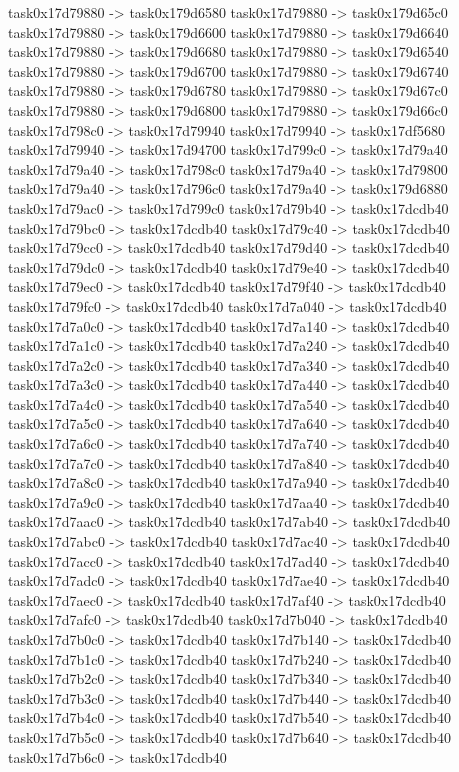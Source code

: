 {	task0x17d79880 -> task0x179d6580
	task0x17d79880 -> task0x179d65c0
	task0x17d79880 -> task0x179d6600
	task0x17d79880 -> task0x179d6640
	task0x17d79880 -> task0x179d6680
	task0x17d79880 -> task0x179d6540
	task0x17d79880 -> task0x179d6700
	task0x17d79880 -> task0x179d6740
	task0x17d79880 -> task0x179d6780
	task0x17d79880 -> task0x179d67c0
	task0x17d79880 -> task0x179d6800
	task0x17d79880 -> task0x179d66c0
	task0x17d798c0 -> task0x17d79940
	task0x17d79940 -> task0x17df5680
	task0x17d79940 -> task0x17d94700
	task0x17d799c0 -> task0x17d79a40
	task0x17d79a40 -> task0x17d798c0
	task0x17d79a40 -> task0x17d79800
	task0x17d79a40 -> task0x17d796c0
	task0x17d79a40 -> task0x179d6880
	task0x17d79ac0 -> task0x17d799c0
	task0x17d79b40 -> task0x17dcdb40
	task0x17d79bc0 -> task0x17dcdb40
	task0x17d79c40 -> task0x17dcdb40
	task0x17d79cc0 -> task0x17dcdb40
	task0x17d79d40 -> task0x17dcdb40
	task0x17d79dc0 -> task0x17dcdb40
	task0x17d79e40 -> task0x17dcdb40
	task0x17d79ec0 -> task0x17dcdb40
	task0x17d79f40 -> task0x17dcdb40
	task0x17d79fc0 -> task0x17dcdb40
	task0x17d7a040 -> task0x17dcdb40
	task0x17d7a0c0 -> task0x17dcdb40
	task0x17d7a140 -> task0x17dcdb40
	task0x17d7a1c0 -> task0x17dcdb40
	task0x17d7a240 -> task0x17dcdb40
	task0x17d7a2c0 -> task0x17dcdb40
	task0x17d7a340 -> task0x17dcdb40
	task0x17d7a3c0 -> task0x17dcdb40
	task0x17d7a440 -> task0x17dcdb40
	task0x17d7a4c0 -> task0x17dcdb40
	task0x17d7a540 -> task0x17dcdb40
	task0x17d7a5c0 -> task0x17dcdb40
	task0x17d7a640 -> task0x17dcdb40
	task0x17d7a6c0 -> task0x17dcdb40
	task0x17d7a740 -> task0x17dcdb40
	task0x17d7a7c0 -> task0x17dcdb40
	task0x17d7a840 -> task0x17dcdb40
	task0x17d7a8c0 -> task0x17dcdb40
	task0x17d7a940 -> task0x17dcdb40
	task0x17d7a9c0 -> task0x17dcdb40
	task0x17d7aa40 -> task0x17dcdb40
	task0x17d7aac0 -> task0x17dcdb40
	task0x17d7ab40 -> task0x17dcdb40
	task0x17d7abc0 -> task0x17dcdb40
	task0x17d7ac40 -> task0x17dcdb40
	task0x17d7acc0 -> task0x17dcdb40
	task0x17d7ad40 -> task0x17dcdb40
	task0x17d7adc0 -> task0x17dcdb40
	task0x17d7ae40 -> task0x17dcdb40
	task0x17d7aec0 -> task0x17dcdb40
	task0x17d7af40 -> task0x17dcdb40
	task0x17d7afc0 -> task0x17dcdb40
	task0x17d7b040 -> task0x17dcdb40
	task0x17d7b0c0 -> task0x17dcdb40
	task0x17d7b140 -> task0x17dcdb40
	task0x17d7b1c0 -> task0x17dcdb40
	task0x17d7b240 -> task0x17dcdb40
	task0x17d7b2c0 -> task0x17dcdb40
	task0x17d7b340 -> task0x17dcdb40
	task0x17d7b3c0 -> task0x17dcdb40
	task0x17d7b440 -> task0x17dcdb40
	task0x17d7b4c0 -> task0x17dcdb40
	task0x17d7b540 -> task0x17dcdb40
	task0x17d7b5c0 -> task0x17dcdb40
	task0x17d7b640 -> task0x17dcdb40
	task0x17d7b6c0 -> task0x17dcdb40
}
